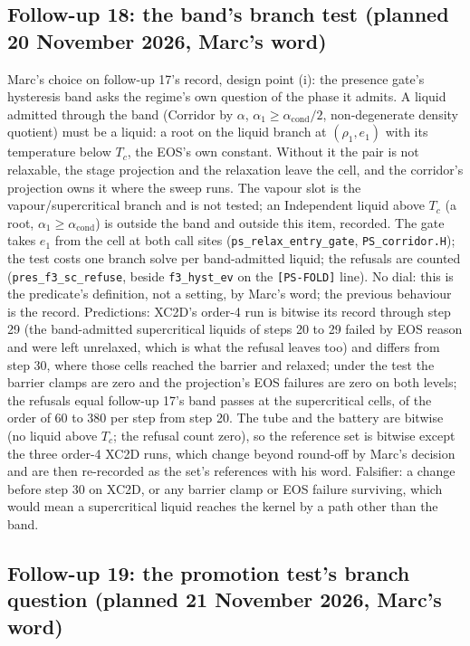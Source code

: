 \documentclass[11pt,a4paper]{article}
\newcommand{\code}[1]{\texttt{\small #1}}
\begin{document}
\subsection*{Follow-up 18: the band's branch test (planned 20 November 2026, Marc's word)}

Marc's choice on follow-up 17's record, design point (i): the presence
gate's hysteresis band asks the regime's own question of the phase it
admits.  A liquid admitted through the band (Corridor by $\alpha$,
$\alpha_1 \ge \alpha_{\mathrm{cond}}/2$, non-degenerate density
quotient) must be a liquid: a root on the liquid branch at
$(\rho_1, e_1)$ with its temperature below $T_c$, the EOS's own
constant.  Without it the pair is not relaxable, the stage projection
and the relaxation leave the cell, and the corridor's projection owns it
where the sweep runs.  The vapour slot is the vapour/supercritical
branch and is not tested; an Independent liquid above $T_c$ (a root,
$\alpha_1 \ge \alpha_{\mathrm{cond}}$) is outside the band and outside
this item, recorded.  The gate takes $e_1$ from the cell at both call
sites (\code{ps\_relax\_entry\_gate}, \code{PS\_corridor.H}); the test
costs one branch solve per band-admitted liquid; the refusals are
counted (\code{pres\_f3\_sc\_refuse}, beside \code{f3\_hyst\_ev} on the
\code{[PS-FOLD]} line).  No dial: this is the predicate's definition,
not a setting, by Marc's word; the previous behaviour is the record.
Predictions: XC2D's order-4 run is bitwise its record through step 29
(the band-admitted supercritical liquids of steps 20 to 29 failed by
EOS reason and were left unrelaxed, which is what the refusal leaves
too) and differs from step 30, where those cells reached the barrier and
relaxed; under the test the barrier clamps are zero and the
projection's EOS failures are zero on both levels; the refusals equal
follow-up 17's band passes at the supercritical cells, of the order of
60 to 380 per step from step 20.  The tube and the battery are bitwise
(no liquid above $T_c$; the refusal count zero), so the reference set
is bitwise except the three order-4 XC2D runs, which change beyond
round-off by Marc's decision and are then re-recorded as the set's
references with his word.  Falsifier: a change before step 30 on XC2D,
or any barrier clamp or EOS failure surviving, which would mean a
supercritical liquid reaches the kernel by a path other than the band.

\subsection*{Follow-up 19: the promotion test's branch question (planned 21 November 2026, Marc's word)}
\end{document}
